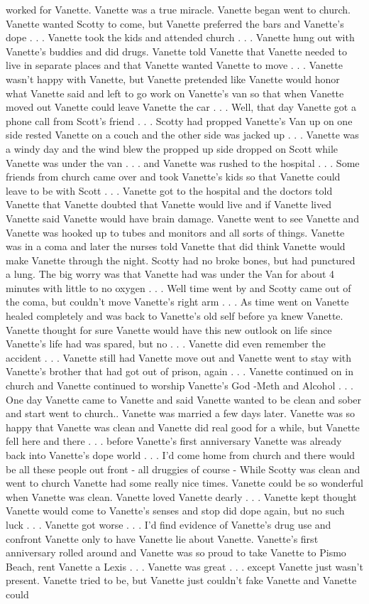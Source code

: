 \documentclass[12pt]{book}
\begin{document}
worked for Vanette. Vanette was a true miracle. Vanette began went to church. Vanette wanted Scotty to come, but Vanette preferred the bars and Vanette's dope  . . .  Vanette took the kids and attended church  . . .  Vanette hung out with Vanette's buddies and did drugs. Vanette told Vanette that Vanette needed to live in separate places and that Vanette wanted Vanette to move  . . .  Vanette wasn't happy with Vanette, but Vanette pretended like Vanette would honor what Vanette said and left to go work on Vanette's van so that when Vanette moved out Vanette could leave Vanette the car  . . .  Well, that day Vanette got a phone call from Scott's friend  . . .  Scotty had propped Vanette's Van up on one side rested Vanette on a couch and the other side was jacked up  . . .  Vanette was a windy day and the wind blew the propped up side dropped on Scott while Vanette was under the van  . . .  and Vanette was rushed to the hospital  . . .  Some friends from church came over and took Vanette's kids so that Vanette could leave to be with Scott  . . .  Vanette got to the hospital and the doctors told Vanette that Vanette doubted that Vanette would live and if Vanette lived Vanette said Vanette would have brain damage. Vanette went to see Vanette and Vanette was hooked up to tubes and monitors and all sorts of things. Vanette was in a coma and later the nurses told Vanette that did think Vanette would make Vanette through the night. Scotty had no broke bones, but had punctured a lung. The big worry was that Vanette had was under the Van for about 4 minutes with little to no oxygen  . . .  Well time went by and Scotty came out of the coma, but couldn't move Vanette's right arm  . . .  As time went on Vanette healed completely and was back to Vanette's old self before ya knew Vanette. Vanette thought for sure Vanette would have this new outlook on life since Vanette's life had was spared, but no  . . .  Vanette did even remember the accident . . .  Vanette still had Vanette move out and Vanette went to stay with Vanette's brother that had got out of prison, again  . . .  Vanette continued on in church and Vanette continued to worship Vanette's God -Meth and Alcohol  . . .  One day Vanette came to Vanette and said Vanette wanted to be clean and sober and start went to church.. Vanette was married a few days later. Vanette was so happy that Vanette was clean and Vanette did real good for a while, but Vanette fell here and there  . . .  before Vanette's first anniversary Vanette was already back into Vanette's dope world  . . .  I'd come home from church and there would be all these people out front - all druggies of course - While Scotty was clean and went to church Vanette had some really nice times. Vanette could be so wonderful when Vanette was clean. Vanette loved Vanette dearly  . . .  Vanette kept thought Vanette would come to Vanette's senses and stop did dope again, but no such luck  . . .  Vanette got worse  . . .  I'd find evidence of Vanette's drug use and confront Vanette only to have Vanette lie about Vanette. Vanette's first anniversary rolled around and Vanette was so proud to take Vanette to Pismo Beach, rent Vanette a Lexis  . . .  Vanette was great  . . .  except Vanette just wasn't present. Vanette tried to be, but Vanette just couldn't fake Vanette and Vanette could 
\end{document}
